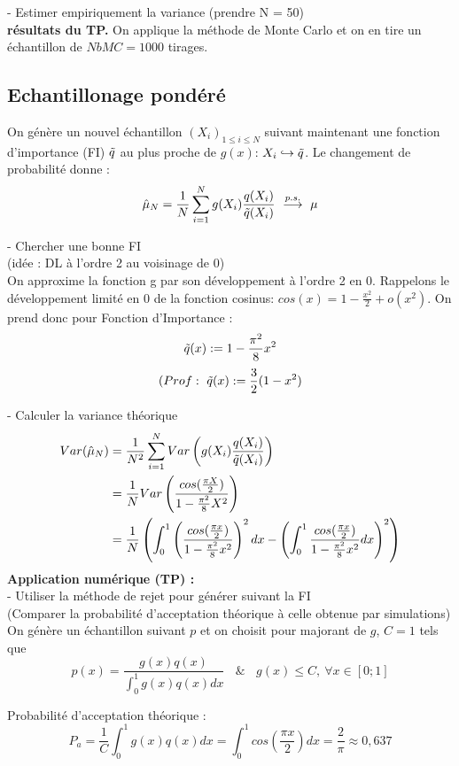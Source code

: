 \documentclass{article}
\begin{document}
- Estimer empiriquement la variance (prendre N = 50)\\
\textbf{résultats du TP.}
On applique la méthode de Monte Carlo et on en tire un échantillon de $NbMC=1000$ tirages.

\subsection{Echantillonage pondéré}
On génère un nouvel échantillon $(X_i)_{1\leq i \leq N}$ suivant maintenant une fonction d'importance (FI) $\Tilde{q}$ au plus proche de $g(x)$: $X_i \hookrightarrow \Tilde{q}$. Le changement de probabilité donne : 
$$ \hat{\mu}_N = \frac1{N} \sum_{i=1}^N g(X_i)\frac{q(X_i)}{\Tilde{q}(X_i)}\ \overset{p.s.}{\longrightarrow}\ \mu $$

- Chercher une bonne FI\\
(idée : DL à l'ordre 2 au voisinage de 0)  \\
On approxime la fonction g par son développement à l'ordre 2 en 0. Rappelons le développement limité en 0 de la fonction cosinus: 
$ cos(x) = 1 - \frac{x^2}{2} + o(x^2) $.
On prend donc pour Fonction d'Importance : 
$$\Tilde{q}(x):= 1 - \frac{\pi^2}{8} x^2$$
$$(Prof :\ \Tilde{q}(x):= \frac32(1 - x^2)$$

- Calculer la variance théorique\\
\begin{align*} 
  Var(\hat{\mu}_N) &= \frac1{N^2} \sum_{i=1}^N Var \left ( g(X_i)\frac{q(X_i)}{\Tilde{q}(X_i)}\right)\\ 
  &= \frac1{N} Var\left (\frac{cos(\frac{\pi X}2)}{1 - \frac{\pi^2}{8} X^2} \right ) \\ 
  &= \frac1{N} \left ( \int_0^1 \left (\frac{cos(\frac{\pi x}2)}{1 - \frac{\pi^2}{8} x^2} \right )^2dx - \left ( \int_0^1 \frac{cos(\frac{\pi x}2)}{1 - \frac{\pi^2}{8} x^2}dx \right )^2 \right )\\
\end{align*}
\textbf{Application numérique (TP) :}
\\

- Utiliser la méthode de rejet pour  générer suivant la FI \\ (Comparer la probabilité d’acceptation théorique à celle obtenue par simulations)\\
On génère un échantillon suivant $p$ et on choisit pour majorant de $g$, $C=1$ tels que 
$$p(x) = \frac{g(x)q(x)}{\int_0^1 g(x)q(x)dx}\ \ \ \ \&\ \ \ \ g(x) \leq C,\ \forall x \in [0;1] $$

Probabilité d'acceptation théorique : 
$$P_a = \frac1C \int_0^1 g(x)q(x)dx 
= \int_0^1 cos(\frac{\pi x}{2})dx 
=\frac{2}{\pi} 
\approx 0,637$$
\end{document}
